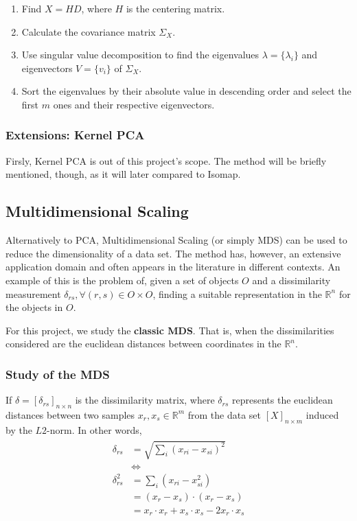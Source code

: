 \documentclass[12pt]{article}
\begin{document}
\begin{enumerate}
	\item Find $X=HD$, where $H$ is the centering matrix.

	\item Calculate the covariance matrix $\Sigma_X$.

	\item Use singular value decomposition to find the eigenvalues $\lambda = \{\lambda_i\}$ and eigenvectors $V = \{v_i\}$ of $\Sigma_X$.

	\item Sort the eigenvalues by their absolute value in descending order and select the first $m$ ones and their respective eigenvectors.
\end{enumerate}

\subsubsection{Extensions: Kernel PCA}

Firsly, Kernel PCA is out of this project's scope. The method will be briefly mentioned, though, as it will later compared to Isomap.

\subsection{Multidimensional Scaling}

Alternatively to PCA, Multidimensional Scaling (or simply MDS) can be used to reduce the dimensionality of a data set. The method has, however, an extensive application domain and often appears in the literature in different contexts. An example of this is the problem of, given a set of objects $O$ and a dissimilarity measurement $\delta_{rs}, \forall (r, s) \in O\times O$, finding a suitable representation in the $\mathbb{R}^n$ for the objects in $O$. \cite{cox2001}

For this project, we study the \textbf{classic MDS}. That is, when the dissimilarities considered are the euclidean distances between coordinates in the $\mathbb{R}^n$.

\subsubsection{Study of the MDS}

If $\delta = [\delta_{rs}]_{n\times n}$ is the dissimilarity matrix, where $\delta_{rs}$ represents the euclidean distances between two samples $x_r, x_s\in \mathbb{R}^m$ from the data set $[X]_{n\times m}$ induced by the $L2$-norm. In other words,
\begin{align}
\label{eq:basemds}
\begin{split}
  \delta_{rs}  &= \sqrt{\sum_i (x_{ri}-x_{si})^2} \\
  &\iff \\
  \delta_{rs}^2 &= \sum_i (x_{ri}-x_{si}^2) \\
  &= (x_r-x_s)\cdot (x_r-x_s) \\
  &= x_r\cdot x_r + x_s\cdot x_s -2x_r\cdot x_s
\end{split}
\end{align}
\end{document}
